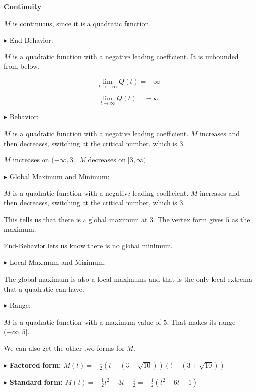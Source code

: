 \documentclass{ximera}
\begin{document}
\begin{example}
\textbf{Continuity}

$M$ is continuous, since it is a quadratic function. 






$\blacktriangleright$ End-Behavior: 

$M$ is a quadratic function with a negative leading coefficient. It is unbounded from below.


\[
\lim\limits_{t \to -\infty} Q(t) = -\infty
\]


\[
\lim\limits_{t \to \infty} Q(t) = -\infty
\]







$\blacktriangleright$ Behavior: 


$M$ is a quadratic function with a negative leading coefficient. $M$ increases and then decreases, switching at the critical number, which is $3$. 



$M$ increases on $(-\infty, 3]$. $M$ decreases on $[3, \infty)$.






$\blacktriangleright$ Global Maximum and Minimum: 


$M$ is a quadratic function with a negative leading coefficient. $M$ increases and then decreases, switching at the critical number, which is $3$. 

This tells us that there is a global maximum at $3$.  The vertex form gives $5$ as the maximum.

End-Behavior lets us know there is no global minimum.






$\blacktriangleright$ Local Maximum and Minimum: 


The global maximum is also a local maximums and that is the only local extrema that a quadratic can have.









$\blacktriangleright$ Range: 


$M$ is a quadratic function with a maximum value of $5$.  That makes its range $(-\infty, 5]$. 









We can also get the other two forms for $M$.


$\blacktriangleright$ \textbf{Factored form: }  $M(t) = -\frac{1}{2} (t - (3 - \sqrt{10})) (t - (3 + \sqrt{10}))$ 

$\blacktriangleright$ \textbf{Standard form: }  $M(t) =  -\frac{1}{2} t^2 + 3t + \frac{1}{2} = -\frac{1}{2}(t^2-6t-1)$




\end{example}
\end{document}
